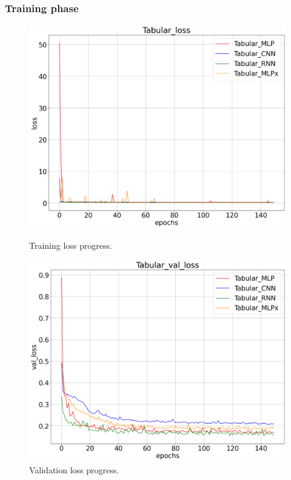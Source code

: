 \subsubsection{Training phase}
\begin{figure}[!h]
    \centering
    \begin{minipage}{0.48\textwidth}
        \centering
        \includegraphics[width=\linewidth]{obrazky-figures/Tabular_experiment/loss_2023-03-23_15:04:45.png}
        \caption{Training loss progress.}
        \label{graph-tabular-loss}
    \end{minipage}\hfill
    \begin{minipage}{0.48\textwidth}
        \centering
        \includegraphics[width=\linewidth]{obrazky-figures/Tabular_experiment/val_loss_2023-03-23_15:04:45.png}
        \caption{Validation loss progress.}
        \label{graph-tabular-val_loss}
    \end{minipage}
\end{figure}
